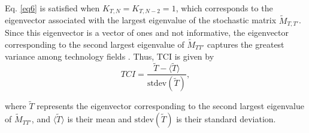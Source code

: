 Eq. \ref{eq6} is satisfied when  \(K_{T,N} = K_{T,N-2} = 1\), which corresponds to the eigenvector associated with the largest eigenvalue of the stochastic matrix \(\widetilde{M}_{T,T'}\). 
Since this eigenvector is a vector of ones and not informative, the eigenvector corresponding to the second largest eigenvalue of \(\widetilde{M}_{TT'}\) captures the greatest variance among technology fields \cite{Hidalgo2021, Mealy2019}.
Thus, TCI is given by
\begin{equation} \label{eq8}
TCI = \frac{\widetilde{T} - \langle \widetilde{T} \rangle}{\text{stdev}(\widetilde{T})},
\end{equation}

where \(\widetilde{T}\) represents the eigenvector corresponding to the second largest eigenvalue of \(\widetilde{M}_{TT'}\), and \(\langle \widetilde{T} \rangle\) is their mean and \(\text{stdev}(\widetilde{T})\) is their standard deviation.
